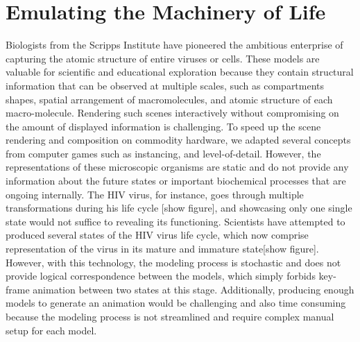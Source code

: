 %
%
%
%
%
%
%
%
%

\section{Emulating the Machinery of Life}

Biologists from the Scripps Institute have pioneered the ambitious enterprise of capturing the atomic structure of entire viruses or cells.
These models are valuable for scientific and educational exploration because they contain structural information that can be observed at multiple scales, such as compartments shapes, spatial arrangement of macromolecules, and atomic structure of each macro-molecule.
Rendering such scenes interactively without compromising on the amount of displayed information is challenging.
To speed up the scene rendering and composition on commodity hardware, we adapted several concepts from computer games such as instancing, and level-of-detail.
However, the representations of these microscopic organisms are static and do not provide any information about the future states or important biochemical processes that are ongoing internally.
The HIV virus, for instance, goes through multiple transformations during his life cycle [show figure], and showcasing only one single state would not suffice to revealing its functioning.
Scientists have attempted to produced several states of the HIV virus life cycle, which now comprise representation of the virus in its mature and immature state[show figure].
However, with this technology, the modeling process is stochastic and does not provide logical correspondence between the models, which simply forbids key-frame animation between two states at this stage.
Additionally, producing enough models to generate an animation would be challenging and also time consuming because the modeling process is not streamlined and require complex manual setup for each model.

